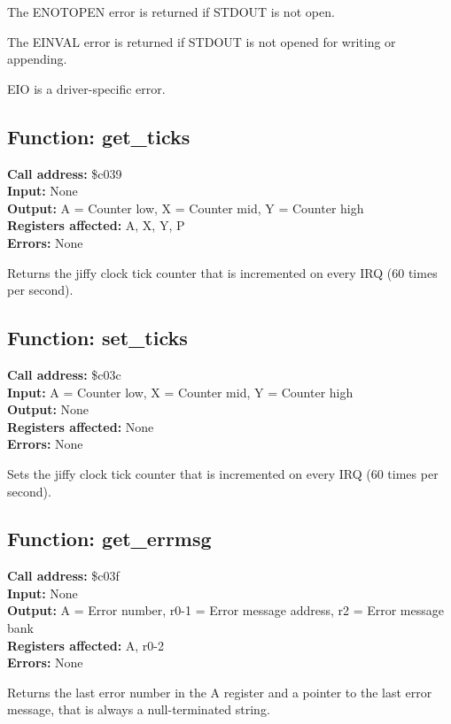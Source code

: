 The ENOTOPEN error is returned if STDOUT is not open.

The EINVAL error is returned if STDOUT is not opened for writing or appending.

EIO is a driver-specific error.


\subsection{Function: get\_ticks}

\textbf{Call address:} \$c039 \\
\textbf{Input:} None \\
\textbf{Output:} A = Counter low, X = Counter mid, Y = Counter high \\
\textbf{Registers affected:} A, X, Y, P \\
\textbf{Errors:} None

Returns the jiffy clock tick counter that is
incremented on every IRQ (60 times per second).


\subsection{Function: set\_ticks}

\textbf{Call address:} \$c03c\\
\textbf{Input:} A = Counter low, X = Counter mid, Y = Counter high \\
\textbf{Output:} None \\
\textbf{Registers affected:} None \\
\textbf{Errors:} None

Sets the jiffy clock tick counter that is
incremented on every IRQ (60 times per second).


\subsection{Function: get\_errmsg}

\textbf{Call address:} \$c03f\\
\textbf{Input:} None \\
\textbf{Output:} A = Error number, r0-1 = Error message address, r2 = Error message bank \\
\textbf{Registers affected:} A, r0-2 \\
\textbf{Errors:} None

Returns the last error number in the A register and a pointer to
the last error message, that is always a null-terminated string.


